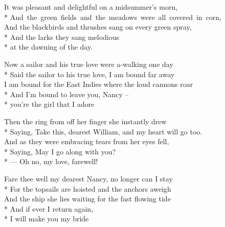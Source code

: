 
\contd
{}

\versemark
It was pleasant and delightful on a midsummer’s morn,\\*
\mbox{And the green fields and the meadows were all covered in corn,}\\
And the blackbirds and thrushes sang on every green spray,\\*
\differentline And the larks they sang melodious\\*
\differentline at the dawning of the day.

\contd
{}


\versemark
Now a sailor and his true love were a-walking one day\\*
Said the sailor to his true love, I am bound far away\\
I am bound for the East Indies where the loud cannons roar\\*
\differentline And I’m bound to leave you, Nancy –\\*
\differentline you’re the girl that I adore\simile

\versemark
Then the ring from off her finger she instantly drew\\*
Saying, Take this, dearest William, and my heart will go too.\\
And as they were embracing tears from her eyes fell,\\*
\differentline Saying, May I go along with you?\\*
\differentline — Oh no, my love, farewell!\simile

\versemark
Fare thee well my dearest Nancy, no longer can I stay\\*
For the topsails are hoisted and the anchors aweigh\\
And the ship she lies waiting for the fast flowing tide\\*
\differentline And if ever I return again,\\*
\differentline I will make you my bride\simile


